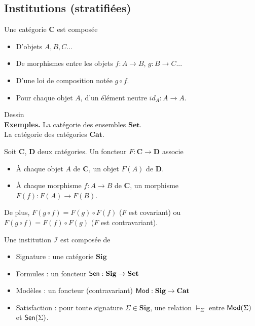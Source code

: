 \documentclass{beamer}
\newcommand{\gr}{\textbf}
\newcommand{\info}[1]{\text{{\fontfamily{lmss}\selectfont #1}}}
\newcommand{\Mod}{\info{Mod}}
\newcommand{\Sen}{\info{Sen}}
\newcommand{\itemz}{\item[$\triangleright$]}
\begin{document}
\subsection{Institutions (stratifiées)}

\begin{frame}
\begin{definition}[Catégorie]
Une catégorie $\textbf{C}$ est composée
\begin{itemize}
\itemz D'objets $A,B,C$...
\itemz De morphismes entre les objets $f : A \to B$, $g : B \to C$...
\itemz D'une loi de composition notée $g \circ f$.
\itemz Pour chaque objet $A$, d'un élément neutre $id_A : A \to A$.
\end{itemize}
\end{definition} \pause 
Dessin \\
\pause
\gr{Exemples.} La catégorie des ensembles $\textbf{Set}$.\\ La catégorie des catégories $\textbf{Cat}$. 
\end{frame}

\begin{frame}
\begin{definition}[Foncteur]
Soit $\gr{C}$, $\gr{D}$ deux catégories. Un foncteur $F : \gr{C} \to \gr{D}$ associe 
\begin{itemize}
\item \`A chaque objet $A$ de $\gr{C}$, un objet $F(A)$ de $\gr{D}$.
\item \`A chaque morphisme $f : A \to B$ de $\gr{C}$, un morphisme $F(f) : F(A) \to F(B)$. 
\end{itemize}
De plus, $F(g \circ f) = F(g) \circ F(f)$ ($F$ est covariant) ou $F(g \circ f) = F(f) \circ F(g)$ ($F$ est contravariant). 
\end{definition}
\end{frame}

\begin{frame}

\begin{definition}[Institution]
Une institution $\mathcal{I}$ est composée de
\begin{itemize}
\itemz Signature : une catégorie $\textbf{Sig}$
\itemz Formules : un foncteur $\Sen : \textbf{Sig} \to \textbf{Set}$
\itemz Modèles : un foncteur (contravariant) $\Mod : \textbf{Sig} \to \textbf{Cat}$
\itemz Satisfaction : pour toute signature $\Sigma \in \textbf{Sig}$, une relation $\models_\Sigma$ entre $\Mod(\Sigma)$ et $\Sen(\Sigma)$.
\end{itemize}
\end{definition}

\end{frame}
\end{document}

